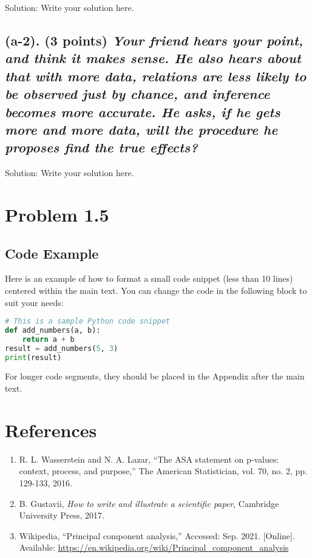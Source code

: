 \documentclass[12pt]{article}
\begin{document}
Solution: Write your solution here.

\subsection*{(a-2). (3 points) \textit{Your friend hears your point, and think it makes sense. He also hears about that with more data, relations are less likely to be observed just by chance, and inference becomes more accurate. He asks, if he gets more and more data, will the procedure he proposes find the true effects?}}

Solution: Write your solution here.

\section*{Problem 1.5}

\subsection*{Code Example}

Here is an example of how to format a small code snippet (less than 10 lines) centered within the main text. You can change the code in the following block to suit your needs:

\begin{center}
\begin{lstlisting}[language=Python]
# This is a sample Python code snippet
def add_numbers(a, b):
    return a + b
result = add_numbers(5, 3)
print(result)
\end{lstlisting}
\end{center}

For longer code segments, they should be placed in the Appendix after the main text.

\section*{References}

\begin{enumerate}
    \item R. L. Wasserstein and N. A. Lazar, “The ASA statement on p-values: context, process, and purpose,” The American Statistician, vol. 70, no. 2, pp. 129-133, 2016.
    \item B. Gustavii, \textit{How to write and illustrate a scientific paper}, Cambridge University Press, 2017.
    \item Wikipedia, “Principal component analysis,” Accessed: Sep. 2021. [Online]. Available: \url{https://en.wikipedia.org/wiki/Principal_component_analysis}
\end{enumerate}
\end{document}
